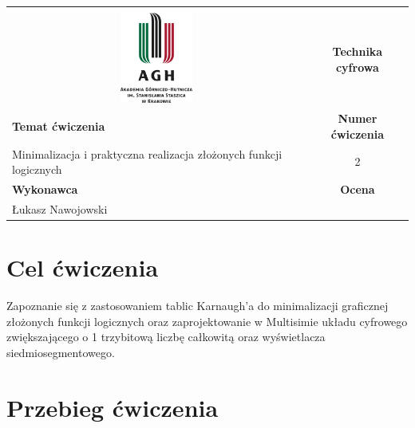 \documentclass[12pt,a4paper]{article}
\begin{document}
\begin{table}[H]
\label{my-label}
\begin{tabular}[width=\textwidth, height=0.5]{|c|c|}
\hline
									           					&                           \\
\includegraphics[height=3cm]{logo}             					& \textbf{Technika cyfrowa} \\ \hline
\multicolumn{1}{|l|}{\textbf{Temat ćwiczenia}} 					& \textbf{Numer ćwiczenia}  \\
\multicolumn{1}{|l|}{Minimalizacja i praktyczna realizacja złożonych funkcji logicznych}	& 2                         \\ \hline
\multicolumn{1}{|l|}{\textbf{Wykonawca}}       & \textbf{Ocena}            \\
\multicolumn{1}{|l|}{Łukasz Nawojowski}          &                           \\ \hline
\end{tabular}
\end{table}

\section{Cel ćwiczenia}
Zapoznanie się z zastosowaniem tablic Karnaugh'a do minimalizacji graficznej złożonych funkcji logicznych oraz zaprojektowanie w Multisimie układu cyfrowego zwiększającego o 1 trzybitową liczbę całkowitą oraz wyświetlacza siedmiosegmentowego.

\section{Przebieg ćwiczenia}
\end{document}
